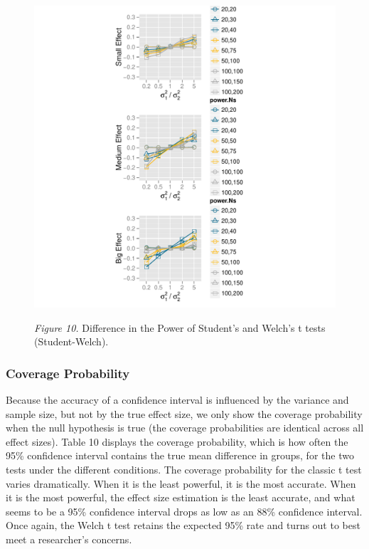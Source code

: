 \documentclass[man,a4paper,noextraspace,apacite]{apa6}\usepackage[]{graphicx}\usepackage[]{color}
\makeatletter
\def\maxwidth{ %
  \ifdim\Gin@nat@width>\linewidth
    \linewidth
  \else
    \Gin@nat@width
  \fi
}
\newenvironment{knitrout}{}{} %
\makeatother
\begin{document}
\begin{figure}
\begin{knitrout}
\color{fgcolor}
\includegraphics[width=\maxwidth]{figure/plotPowerDiff} 

\end{knitrout}
\textit{Figure 10.} Difference in the Power of Student's and Welch's t tests (Student-Welch).
\end{figure}

\subsubsection{Coverage Probability}
Because the accuracy of a confidence interval is influenced by the variance and sample size, but not by the true effect size, we only show the coverage probability when the null hypothesis is true (the coverage probabilities are identical across all effect sizes). Table 10 displays the coverage probability, which is how often the 95\% confidence interval contains the true mean difference in groups, for the two tests under the different conditions. The coverage probability for the classic t test varies dramatically. When it is the least powerful, it is the most accurate. When it is the most powerful, the effect size estimation is the least accurate, and what seems to be a 95\% confidence interval drops as low as an 88\% confidence interval. Once again, the Welch t test retains the expected 95\% rate and turns out to best meet a researcher's concerns. 
\end{document}

